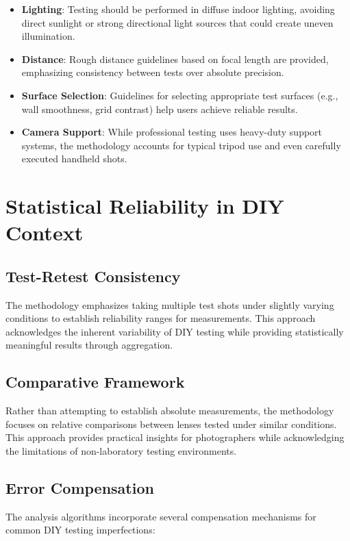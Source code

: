 \begin{itemize}
    \item \textbf{Lighting}: Testing should be performed in diffuse indoor lighting, avoiding direct sunlight or strong directional light sources that could create uneven illumination.
    \item \textbf{Distance}: Rough distance guidelines based on focal length are provided, emphasizing consistency between tests over absolute precision.
    \item \textbf{Surface Selection}: Guidelines for selecting appropriate test surfaces (e.g., wall smoothness, grid contrast) help users achieve reliable results.
    \item \textbf{Camera Support}: While professional testing uses heavy-duty support systems, the methodology accounts for typical tripod use and even carefully executed handheld shots.
\end{itemize}

\section{Statistical Reliability in DIY Context}

\subsection{Test-Retest Consistency}
The methodology emphasizes taking multiple test shots under slightly varying conditions to establish reliability ranges for measurements. This approach acknowledges the inherent variability of DIY testing while providing statistically meaningful results through aggregation.

\subsection{Comparative Framework}
Rather than attempting to establish absolute measurements, the methodology focuses on relative comparisons between lenses tested under similar conditions. This approach provides practical insights for photographers while acknowledging the limitations of non-laboratory testing environments.

\subsection{Error Compensation}
The analysis algorithms incorporate several compensation mechanisms for common DIY testing imperfections:

